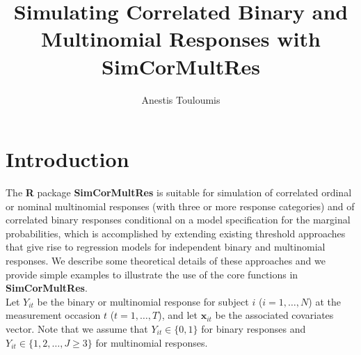 \documentclass{article}
\title{Simulating Correlated Binary and Multinomial Responses with \textbf{SimCorMultRes}}
\author{Anestis Touloumis}
\begin{document}

\date{}
\maketitle
\section{Introduction}
The \textbf{R} package \textbf{SimCorMultRes} is suitable for simulation of correlated ordinal or nominal multinomial responses (with three or more response categories) and of correlated binary responses conditional on a model specification for the marginal probabilities, which is accomplished by extending existing threshold approaches that give rise to regression models for independent binary and multinomial responses. We describe some theoretical details of these approaches and we provide simple examples to illustrate the use of the core functions in \textbf{SimCorMultRes}.\\
\indent Let $Y_{it}$ be the binary or multinomial response for subject $i$ ($i=1,\ldots,N$) at the measurement occasion $t$ ($t=1,\ldots,T$), and let $\mathbf {x}_{it}$ be the associated covariates vector. Note that we assume that $Y_{it} \in \{0,1\}$ for binary responses and $Y_{it} \in \{1,2,\ldots,J\geq 3\}$ for multinomial responses. 
\end{document}
